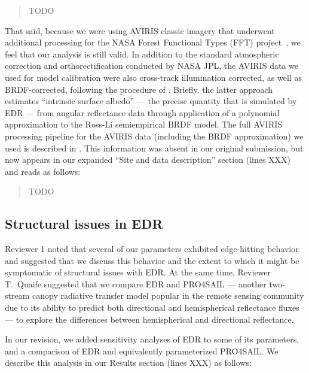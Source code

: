\documentclass{article}
\begin{document}
\begin{quote}

  TODO

\end{quote}

That said, because we were using AVIRIS classic imagery that underwent additional processing for the NASA Forest Functional Types (FFT) project~\citep{singh2015imaging}, we feel that our analysis is still valid.
In addition to the standard atmospheric correction and orthorectification conducted by NASA JPL, the AVIRIS data we used for model calibration were also cross-track illumination corrected, as well as BRDF-corrected, following the procedure of \citet{lucht2000algorithm}.
Briefly, the latter approach estimates “intrinsic surface albedo” --- the precise quantity that is simulated by EDR --- from angular reflectance data through application of a polynomial approximation to the Ross-Li semiempirical BRDF model.
The full AVIRIS processing pipeline for the  AVIRIS data (including the BRDF approximation) we used is described in \citet{singh2015imaging}.
This information was absent in our original submission, but now appears in our expanded ``Site and data description'' section (lines XXX) and reads as follows:

\begin{quote}

  TODO

\end{quote}

\subsection{Structural issues in EDR}\label{subsec:structural}

Reviewer 1 noted that several of our parameters exhibited edge-hitting behavior and suggested that we discuss this behavior and the extent to which it might be symptomatic of structural issues with EDR.\@
At the same time, Reviewer T.\ Quaife suggested that we compare EDR and PRO4SAIL --- another two-stream canopy radiative transfer model popular in the remote sensing community due to its ability to predict both directional and hemispherical reflectance fluxes --- to explore the differences between hemispherical and directional reflectance.

In our revision, we added sensitivity analyses of EDR to some of its parameters, and a comparison of EDR and equivalently parameterized PRO4SAIL.\@
We describe this analysis in our Results section (lines XXX) as follows:
\end{document}
